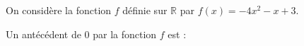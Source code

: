 
On considère la fonction $f$ définie sur $\mathbb{R}$ par $f(x)=-4x^2-x+3$.

Un antécédent de $0$ par la fonction $f$ est :

\smallskip
{}
